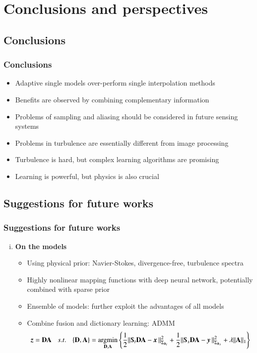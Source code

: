 \documentclass{beamer}
\let\olditem\item
\renewcommand{\item}{\setlength{\itemsep}{\fill}\olditem}
\begin{document}
\section{Conclusions and perspectives}
\subsection[Conclusions]{Conclusions}
\begin{frame}
\frametitle{Conclusions}
\begin{itemize}
	\item Adaptive single models over-perform single interpolation methods
	\item Benefits are observed by combining complementary information
	\item Problems of sampling and aliasing should be considered in future sensing systems
	\item Problems in turbulence are essentially different from image processing
	\item Turbulence is hard, but complex learning algorithms are promising
	\item Learning is powerful, but physics is also crucial
\end{itemize}	
\end{frame}

\subsection[Perspectives]{Suggestions for future works}
\begin{frame}
\frametitle{Suggestions for future works}
\begin{enumerate}[(i)]
	\item \textbf{On the models}
	\begin{itemize}
		\item Using physical prior: Navier-Stokes, divergence-free, turbulence spectra
		\item Highly nonlinear mapping functions with deep neural network, potentially combined with sparse prior
		\item Ensemble of models: further exploit the advantages of all models
		\item Combine fusion and dictionary learning: ADMM 
		\begin{equation*}
			\z = \dict \dictco \:\:\:\: s.t. \:\:\:\: \{\dict,\dictco\} = \argmin_{\dict,\dictco} \left\lbrace \frac{1}{2} \Vert \Sub_t\dict \dictco -\x \Vert^2_{\Sigma_{\h_t}} + \frac{1}{2} \Vert \Sub_s\dict\dictco -\y \Vert^2_{\Sigma_{\h_s}} + \lambda \Vert \dictco \Vert_1 \right\rbrace
		\end{equation*}
	\end{itemize}
\end{enumerate}	
\end{frame}
\end{document}
